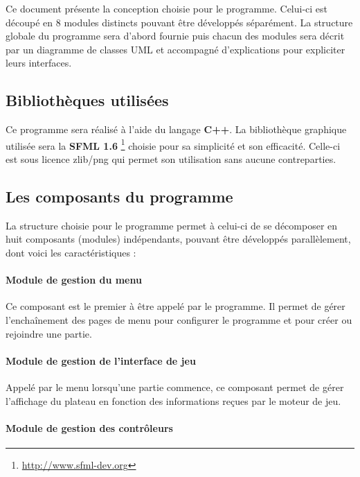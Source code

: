 Ce document présente la conception choisie pour le programme. Celui-ci est découpé en 8 modules distincts pouvant être développés séparément.  La structure globale du programme sera d'abord fournie puis chacun des modules sera décrit par un diagramme de classes UML et accompagné d'explications pour expliciter leurs interfaces.

\vspace{0.5cm}

\subsection{Bibliothèques utilisées}

Ce programme sera réalisé à l'aide du langage \textbf{C++}. La bibliothèque graphique utilisée sera la \textbf{SFML 1.6} \footnote{\url{http://www.sfml-dev.org}} choisie pour sa simplicité et son efficacité. Celle-ci est sous licence zlib/png qui permet son utilisation sans aucune contreparties.

\subsection{Les composants du programme}

La structure choisie pour le programme permet à celui-ci de se décomposer en huit composants (modules) indépendants, pouvant être développés parallèlement, dont voici les caractéristiques :

\paragraph{Module de gestion du menu}

Ce composant est le premier à être appelé par le programme. Il permet de gérer l'enchaînement des pages de menu pour configurer le programme et pour créer ou rejoindre une partie.

\paragraph{Module de gestion de l'interface de jeu}

Appelé par le menu lorsqu'une partie commence, ce composant permet de gérer l'affichage du plateau en fonction des informations reçues par le moteur de jeu.

\paragraph{Module de gestion des contrôleurs}

